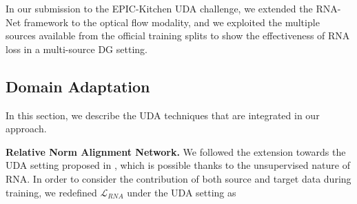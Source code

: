 In our submission to the EPIC-Kitchen UDA challenge, we extended the RNA-Net framework to the optical flow modality, and we exploited the multiple sources available from the official training splits to show the effectiveness of RNA loss in a multi-source DG setting. %

    
 
    

\subsection{Domain Adaptation}
In this section, we describe the UDA techniques that are integrated in our approach.

\textbf{Relative Norm Alignment Network.} We followed the extension towards the UDA setting proposed in \cite{planamente2021crossdomain}, which is possible thanks to the unsupervised nature of RNA. %
In order to consider the contribution of both source and target data during training, we redefined $\mathcal{L}_{RNA}$ under the UDA setting as 

